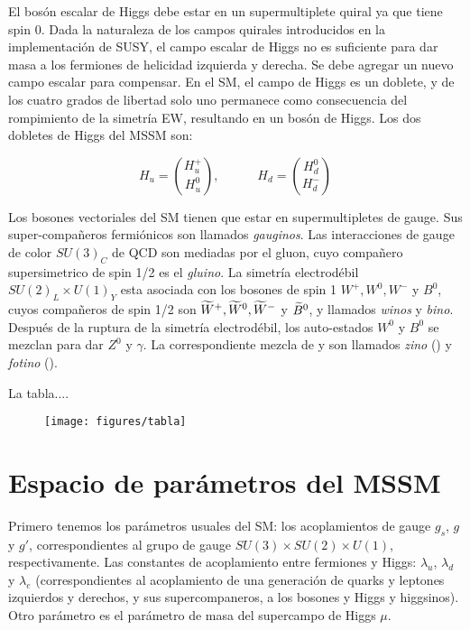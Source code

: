 El bosón escalar de Higgs debe estar en un supermultiplete quiral ya que tiene
spin 0.
Dada la naturaleza de los campos quirales introducidos en la implementación de
SUSY, el campo escalar de Higgs no es suficiente para dar masa a los fermiones
de helicidad izquierda y derecha.
Se debe agregar un nuevo campo escalar para compensar. En el SM, el campo de
Higgs es un doblete, y de los cuatro grados de libertad solo uno permanece
como consecuencia del rompimiento de la simetría EW, resultando en un bosón
de Higgs. Los dos dobletes de Higgs del MSSM son:

\begin{equation}
  H_u = \binom{H_u^+}{H_u^0}, \quad \quad \quad H_d = \binom{H_d^0}{H_d^-}
\end{equation}

Los bosones vectoriales del SM tienen que estar en supermultipletes de gauge.
Sus super-compañeros fermiónicos son llamados \emph{gauginos}. Las interacciones
de gauge de color $SU(3)_C$ de QCD son mediadas por el gluon, cuyo compañero
supersimetrico de spin 1/2 es el \emph{gluino}. La simetría electrodébil
$SU(2)_L \times U(1)_Y$ esta asociada con los bosones de spin 1 $W^+, W^0, W^-$
y $B^0$, cuyos compañeros de spin 1/2 son $\widetilde{W}^+, \widetilde{W}^0, \widetilde{W}^-$
y $\widetilde{B}^0$, y llamados \emph{winos} y \emph{bino}.
Después de la ruptura de la simetría electrodébil, los auto-estados $W^0$ y $B^0$
se mezclan para dar $Z^0$ y $\gamma$. La correspondiente mezcla de {\winozero}
y {\bino} son llamados \emph{zino} (\zino) y \emph{fotino} (\photino).

La tabla....

\begin{figure}[h]
  \centering
  \texttt{[image: figures/tabla]}
\end{figure}

\section{Espacio de parámetros del MSSM}

Primero tenemos los parámetros usuales del SM: los acoplamientos
de gauge $g_s$, $g$ y $g'$, correspondientes al grupo de gauge
$SU(3) \times SU(2) \times U(1)$, respectivamente. Las constantes
de acoplamiento entre fermiones y Higgs: $\lambda_u$, $\lambda_d$
y $\lambda_e$ (correspondientes al acoplamiento de una generación
de quarks y leptones izquierdos y derechos, y sus supercompaneros,
a los bosones y Higgs y higgsinos). Otro parámetro es el parámetro de masa
del supercampo de Higgs $\mu$.

